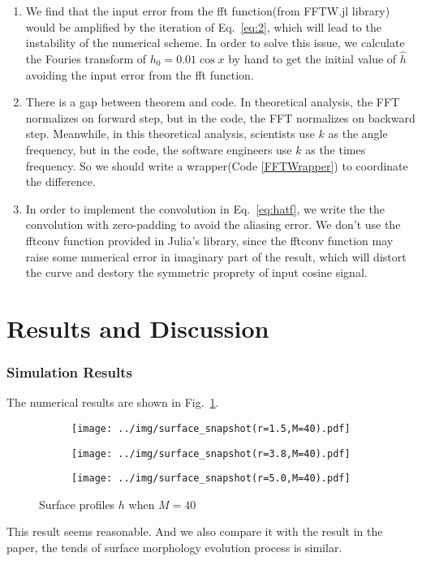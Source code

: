 \documentclass[runningheads]{llncs}
\begin{document}
\begin{enumerate}
\item We find that the input error from the fft function(from FFTW.jl library\cite{FFTW}) would be amplified by the iteration of Eq.~\eqref{eq:2},
which will lead to the instability of the numerical scheme.
In order to solve this issue, we calculate the Fouries transform of $h_0=0.01\cos x$ by hand to get the initial value of $\hat{h}$ avoiding the input error from the fft function.

\item There is a gap between theorem and code. In theoretical analysis, the FFT normalizes on forward step, but in the code, the FFT normalizes on backward step. 
Meanwhile, in this theoretical analysis, scientists use $k$ as the angle frequency, but in the code, the software engineers use $k$ as the times frequency. So we should write a wrapper(Code \ref{FFTWrapper}) to coordinate the difference.

\item In order to implement the convolution in Eq.~\eqref{eq:hatf}, we write the the convolution with zero-padding to avoid the aliasing error. We don't use the fftconv function provided in Julia's library, 
since the fftconv function may raise some numerical error in imaginary part of the result, which will distort the curve and destory the symmetric proprety of input cosine signal.

\end{enumerate}

\section{Results and Discussion}

\subsubsection{Simulation Results}

The numerical results are shown in Fig.~\ref{fig:1}.

\begin{figure}[!htbp]
    \centering
    \begin{subfigure}{.4\textwidth}
        \centering
        \texttt{[image: ../img/surface\_snapshot(r=1.5,M=40).pdf]}  
    \end{subfigure}
    \begin{subfigure}{.4\textwidth}
        \centering
        \texttt{[image: ../img/surface\_snapshot(r=3.8,M=40).pdf]}  
    \end{subfigure}
    \begin{subfigure}{.4\textwidth}
        \centering
        \texttt{[image: ../img/surface\_snapshot(r=5.0,M=40).pdf]}  
    \end{subfigure}
    \caption{Surface profiles $h$ when $M=40$}
    \label{fig:1}
\end{figure}
This result seems reasonable. 
And we also compare it with the result in the paper\cite{dong2023corrosion}, the tends of surface morphology evolution process is similar.
\end{document}

